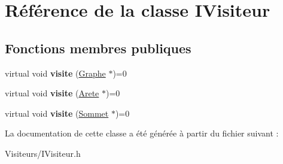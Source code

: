 \hypertarget{class_i_visiteur}{}\section{Référence de la classe I\+Visiteur}
\label{class_i_visiteur}
\subsection*{Fonctions membres publiques}
\begin{DoxyCompactItemize}
\item 
\mbox{\label{class_i_visiteur_a657913cc4f3296797762843323cd5291}} 
virtual void {\bfseries visite} (\mbox{\hyperlink{class_graphe}{Graphe}} $\ast$)=0
\item 
\mbox{\label{class_i_visiteur_a1ffbd605e5c0acbad0b68a77785bdd27}} 
virtual void {\bfseries visite} (\mbox{\hyperlink{class_arete}{Arete}} $\ast$)=0
\item 
\mbox{\label{class_i_visiteur_a81cce7267302670121358cb25dc6fa83}} 
virtual void {\bfseries visite} (\mbox{\hyperlink{class_sommet}{Sommet}} $\ast$)=0
\end{DoxyCompactItemize}


La documentation de cette classe a été générée à partir du fichier suivant \+:\begin{DoxyCompactItemize}
\item 
Visiteurs/I\+Visiteur.\+h\end{DoxyCompactItemize}
